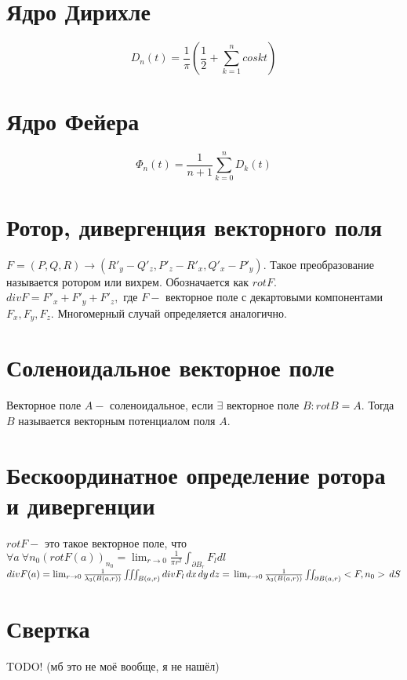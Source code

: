 \documentclass[paper=a4, fontsize=17pt]{article}
\begin{document}
	\section{Ядро Дирихле}

	$$ D_n(t) = \frac{1}{\pi}( \frac{1}{2} + \sum_{k = 1}^{n} coskt) $$
	
	\section{Ядро Фейера} 
	
	$$ \Phi_n(t) = \frac{1}{n+1} \sum_{k = 0}^{n} D_k(t) $$

	\section{Ротор, дивергенция векторного поля}
	$F = (P, Q, R) \rightarrow (R'_y - Q'_z, P'_z - R'_x, Q'_x - P'_y).$ Такое преобразование называется ротором или вихрем. Обозначается как $rot F$.
\\

	$div F  = F'_x + F'_y + F'_z, $ где $F - $ векторное поле с декартовыми компонентами $F_x, F_y, F_z$. Многомерный случай определяется аналогично.

	\section{Соленоидальное векторное поле}
	Векторное поле $A-$ соленоидальное, если $\exists$ векторное поле $B: rotB = A$. Тогда $B$ называется векторным потенциалом поля $A$.

	\section{Бескоординатное определение ротора и дивергенции}
	$rot F -$ это такое векторное поле, что $\forall a \ \forall n_0 (rot F(a))_{n_0} = \lim_{r\to 0} \frac{1}{\pi r^2} \int_{\partial B_r} F_ldl$
\\

	$div F(a) = \lim_{r\to 0} \frac{1}{\lambda_3(B(a,r))} \iiint_{B(a,r)} div F_l \,dx\,dy\,dz = \\ \lim_{r\to 0} \frac{1}{\lambda_3(B(a,r))} \iint_{\partial B(a,r)} <F, n_0>\,dS$

	\section{Свертка}
	TODO! (мб это не моё вообще, я не нашёл)
\end{document}
